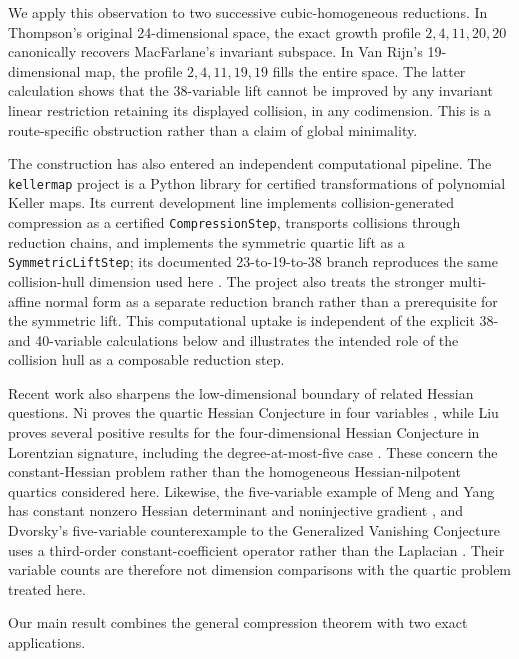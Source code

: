 \documentclass[11pt]{article}
\theoremstyle{remark}
\begin{document}
We apply this observation to two successive cubic-homogeneous reductions. In Thompson's original 24-dimensional space, the exact growth profile $2,4,11,20,20$ canonically recovers MacFarlane's invariant subspace. In Van Rijn's 19-dimensional map, the profile $2,4,11,19,19$ fills the entire space. The latter calculation shows that the 38-variable lift cannot be improved by any invariant linear restriction retaining its displayed collision, in any codimension. This is a route-specific obstruction rather than a claim of global minimality.

The construction has also entered an independent computational pipeline. The \texttt{kellermap} project is a Python library for certified transformations of polynomial Keller maps. Its current development line implements collision-generated compression as a certified \texttt{CompressionStep}, transports collisions through reduction chains, and implements the symmetric quartic lift as a \texttt{SymmetricLiftStep}; its documented 23-to-19-to-38 branch reproduces the same collision-hull dimension used here \citep{KellerMap2026}. The project also treats the stronger multi-affine normal form as a separate reduction branch rather than a prerequisite for the symmetric lift. This computational uptake is independent of the explicit 38- and 40-variable calculations below and illustrates the intended role of the collision hull as a composable reduction step.

Recent work also sharpens the low-dimensional boundary of related Hessian questions. Ni proves the quartic Hessian Conjecture in four variables \citep{Ni2026}, while Liu proves several positive results for the four-dimensional Hessian Conjecture in Lorentzian signature, including the degree-at-most-five case \citep{Liu2026}. These concern the constant-Hessian problem rather than the homogeneous Hessian-nilpotent quartics considered here. Likewise, the five-variable example of Meng and Yang has constant nonzero Hessian determinant and noninjective gradient \citep{MengYang2026}, and Dvorsky's five-variable counterexample to the Generalized Vanishing Conjecture uses a third-order constant-coefficient operator rather than the Laplacian \citep{Dvorsky2026}. Their variable counts are therefore not dimension comparisons with the quartic problem treated here.

Our main result combines the general compression theorem with two exact applications.
\end{document}
